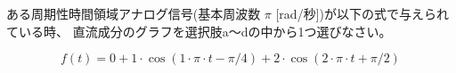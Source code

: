 ある周期性時間領域アナログ信号(基本周波数 $\pi$ [rad/秒])が以下の式で与えられている時、
直流成分のグラフを選択肢a〜dの中から1つ選びなさい。

\[
f(t) = 
0
+ 1 \cdot \cos( 1 \cdot \pi \cdot t - \pi/4 )
+ 2 \cdot \cos( 2 \cdot \pi \cdot t + \pi/2 )
\]
